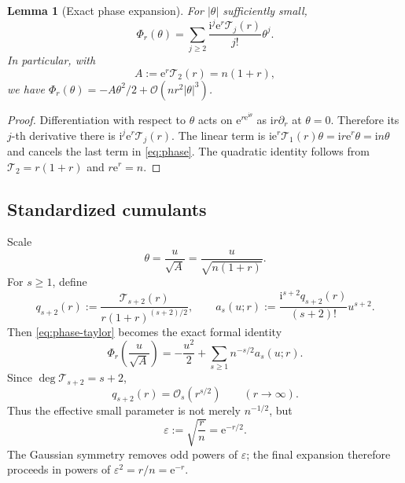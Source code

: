 \documentclass[11pt,a4paper]{article}
\newtheorem{lemma}[theorem]{Lemma}
\theoremstyle{definition}
\theoremstyle{remark}
\newcommand{\Tch}{\mathscr T}
\newcommand{\ii}{\mathrm i}
\newcommand{\ee}{\mathrm e}
\newcommand{\BigO}{\mathcal O}
\begin{document}
\begin{lemma}[Exact phase expansion]\label{lem:phase-expansion}
For \(|\theta|\) sufficiently small,
\begin{equation}\label{eq:phase-taylor}
 \Phi_r(\theta)
 =\sum_{j\ge2}\frac{\ii^j\ee^r\Tch_j(r)}{j!}\theta^j.
\end{equation}
In particular, with
\begin{equation}\label{eq:variance-A}
 A:=\ee^r\Tch_2(r)=n(1+r),
\end{equation}
we have \(\Phi_r(\theta)=-A\theta^2/2+\BigO(nr^2|\theta|^3)\).
\end{lemma}

\begin{proof}
Differentiation with respect to \(\theta\) acts on
\(\ee^{r\ee^{\ii\theta}}\) as \(\ii r\partial_r\) at \(\theta=0\).  Therefore
its \(j\)-th derivative there is \(\ii^j\ee^r\Tch_j(r)\).  The linear term is
\(\ii\ee^r\Tch_1(r)\theta=\ii r\ee^r\theta=\ii n\theta\) and cancels the last
term in \cref{eq:phase}.  The quadratic identity follows from
\(\Tch_2=r(1+r)\) and \(r\ee^r=n\).
\end{proof}

\subsection{Standardized cumulants}

Scale
\begin{equation}\label{eq:theta-scale}
  \theta=\frac{u}{\sqrt{A}}
  =\frac{u}{\sqrt{n(1+r)}}.
\end{equation}
For \(s\ge1\), define
\begin{equation}\label{eq:qj-def}
 q_{s+2}(r):=\frac{\Tch_{s+2}(r)}{r(1+r)^{(s+2)/2}},
 \qquad
 a_s(u;r):=\frac{\ii^{s+2}q_{s+2}(r)}{(s+2)!}u^{s+2}.
\end{equation}
Then \cref{eq:phase-taylor} becomes the exact formal identity
\begin{equation}\label{eq:scaled-phase}
 \Phi_r\!\left(\frac{u}{\sqrt A}\right)
 =-\frac{u^2}{2}+\sum_{s\ge1}n^{-s/2}a_s(u;r).
\end{equation}
Since \(\deg \Tch_{s+2}=s+2\),
\begin{equation}\label{eq:q-growth}
  q_{s+2}(r)=\BigO_s(r^{s/2})
  \qquad(r\to\infty).
\end{equation}
Thus the effective small parameter is not merely \(n^{-1/2}\), but
\[
  \varepsilon:=\sqrt{\frac rn}=\ee^{-r/2}.
\]
The Gaussian symmetry removes odd powers of \(\varepsilon\); the final expansion
therefore proceeds in powers of \(\varepsilon^2=r/n=\ee^{-r}\).
\end{document}
